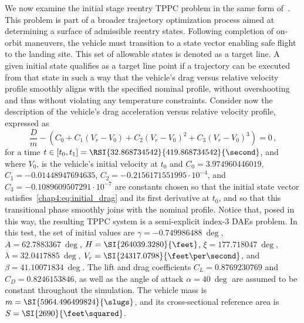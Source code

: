 We now examine the initial stage reentry \ac{TPPC} problem in the same form of~\cite{brenan1986numerical}. This problem is part of a broader trajectory optimization process aimed at determining a surface of admissible reentry states. Following completion of on-orbit maneuvers, the vehicle must transition to a state vector enabling safe flight to the landing site. This set of allowable states is denoted as a target line. A given initial state qualifies as a target line point if a trajectory can be executed from that state in such a way that the vehicle's drag versus relative velocity profile smoothly aligns with the specified nominal profile, without overshooting and thus without violating any temperature constraints. Consider now the description of the vehicle's drag acceleration versus relative velocity profile, expressed as
%
\begin{equation}
  \dfrac{D}{m} - (C_0 + C_1 (V_r - V_0) + C_2 (V_r - V_0)^2 + C_3 (V_r - V_0)^3) = 0 \, \text{,}
  \label{chap4:eq:initial_drag}
\end{equation}
%
for a time $t \in [t_0, t_1] = \RSI{32.868734542}{419.868734542}{\second}$, and where $V_0$, is the vehicle's initial velocity at $t_0$ and $C_0 = 3.974960446019$, $C_1 = -0.01448947694635$, $C_2 = -0.2156171551995 \cdot 10^{-4}$, and $C_3 = -0.1089609507291 \cdot 10^{-7}$ are constants chosen so that the initial state vector satisfies~\eqref{chap4:eq:initial_drag} and its first derivative at $t_0$, and so that this transitional phase smoothly joins with the nominal profile. Notice that, posed in this way, the resulting \ac{TPPC} system is a semi-explicit index-3 \acp{DAE} problem. In this test, the set of initial values are $\gamma = \SI{-0.749986488}{\deg}$, $A = \SI{62.7883367}{\deg}$, $H = \SI{264039.3280}{\feet}$, $\xi = \SI{177.718047}{\deg}$, $\lambda = \SI{32.0417885}{\deg}$, $V_r = \SI{24317.0798}{\feet\per\second}$, and $\beta = \SI{41.10071834}{\deg}$. The lift and drag coefficients $C_L = 0.8769230769$ and $C_D = 0.8246153846$, as well as the angle of attack $\alpha = \SI{40}{\deg}$ are assumed to be constant throughout the simulation. The vehicle mass is $m = \SI{5964.496499824}{\slugs}$, and its cross-sectional reference area is $S = \SI{2690}{\feet\squared}$.

